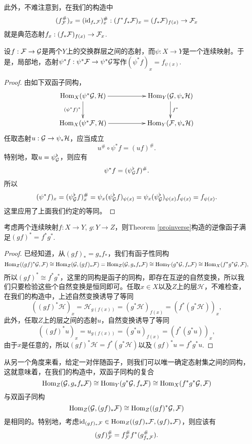 此外，不难注意到，在我们的构造中
\[
	(f_{\mathcal{F}}^\#)_x=(\operatorname{id}_{f_*\mathcal{F}})^\#_x:(f^*f_*\mathcal{F})_x=(f_*\mathcal{F})_{f(x)}\to \mathcal{F}_x
\]
就是典范态射$f_x:(f_*\mathcal{F})_{f(x)}\to \mathcal{F}_x$.

\begin{pro}
设$f:\mathcal{F}\to\mathcal{G}$是两个$Y$上的交换群层之间的态射，而$\psi:X\to Y$是一个连续映射。于是，局部地，态射$\psi^*f:\psi^*\mathcal{F}\to \psi^*\mathcal{G}$写作$(\psi^* f)_x=f_{\psi(x)}$.
\end{pro}

\begin{proof}
由如下双函子同构，
\[
	\xymatrix{
		\Hom_X(\psi^*\calg,\mathcal{H})\ar[rr] \ar[d]_{(\psi^*f)^*}&&\Hom_Y(\calg,\psi_*\mathcal{H}) \ar[d]^{f^*}\\
		\Hom_X(\psi^*\calf,\mathcal{H})\ar[rr]&&\Hom_Y(\calf,\psi_*\mathcal{H})
	}
\]
任取态射$u:\mathcal{G}\to \psi_*\mathcal{H}$，应当成立
\[
	u^\#\circ \psi^* f=(uf)^\#.
\]
特别地，取$u=\psi_{\mathcal{G}}^\flat$，则应有
\[
	\psi^* f=(\psi_{\mathcal{G}}^\flat f)^\#.
\]
所以
\[
	(\psi^* f)_x=(\psi_{\mathcal{G}}^\flat f)^\#_x =\psi_x (\psi_{\mathcal{G}}^\flat f)_{\psi(x)}=\psi_x (\psi_{\mathcal{G}}^\flat)_{\psi(x)} f_{\psi(x)}=f_{\psi(x)}.
\]
这里应用了上面我们约定的等同。
\end{proof}

\begin{pro}[逆像函子的复合]
考虑两个连续映射$f:X\to Y$, $g:Y\to Z$，则Theorem \ref{proinverse}构造的逆像函子满足$(gf)^*=f^*g^*$.
\end{pro}

\begin{proof}
已经知道，从$(gf)_*=g_*f_*$，我们有函子性同构
\[
	\operatorname{Hom}_Z((gf)^*\mathcal{G},\mathcal{F})\cong \operatorname{Hom}_Z(\mathcal{G},(gf)_*\mathcal{F})=\operatorname{Hom}_Z(\mathcal{G},g_*f_*\mathcal{F})\cong \operatorname{Hom}_Y(g^*\mathcal{G},f_*\mathcal{F})\cong \operatorname{Hom}_X(f^*g^*\mathcal{G},\mathcal{F}),
\]
所以$(gf)^*\cong f^*g^*$，这里的同构是函子的同构，即存在互逆的自然变换，所以我们只要检验这些个自然变换是恒同即可。任取$x\in X$以及$Z$上的层$\mathcal H$，不难检查，在我们的构造中，上述自然变换诱导了等同
\[
	((gf)^*\mathcal H)_x=\mathcal H_{g(f(x))}=(g^* \mathcal H)_{f(x)}=(f^*(g^*\mathcal H))_x,
\]
此外，任取$Z$上的层之间的态射$u$，自然变换诱导了等同
\[
	((gf)^* u)_x= u_{g(f(x))}=(g^* u)_{f(x)}=(f^*(g^* u))_x,
\]
由于$x$是任意的，所以$(gf)^*\mathcal H=f^*(g^*\mathcal H)$以及$(gf)^* u=f^*g^* u$.
\end{proof}

从另一个角度来看，给定一对伴随函子，则我们可以唯一确定态射集之间的同构，这就意味着，在我们的构造中，双函子同构的复合
\[
	\operatorname{Hom}_Z(\mathcal{G},g_*f_*\mathcal{F})\cong \operatorname{Hom}_Y(g^*\mathcal{G},f_*\mathcal{F})\cong \operatorname{Hom}_X(f^*g^*\mathcal{G},\mathcal{F})
\]
与双函子同构
\[
	\operatorname{Hom}_Z(\mathcal{G},(gf)_*\mathcal{F})\cong \operatorname{Hom}_Z((gf)^*\mathcal{G},\mathcal{F})
\]
是相同的。特别地，考虑$\operatorname{id}_{(gf)_*\mathcal{F}}\in \operatorname{Hom}_Z((gf)_*\mathcal{F},(gf)_*\mathcal{F})$，则应该有
\[
	(gf)^\#_{\mathcal{F}} = f_{\mathcal{F}}^\# f^*(g_{f_*\mathcal{F}}^\#).
\]

